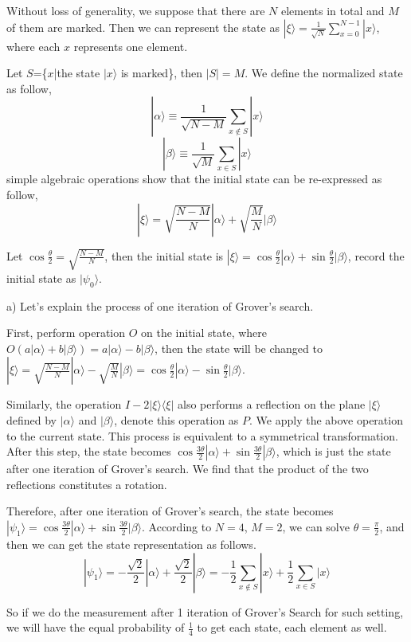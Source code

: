 \documentclass[11pt]{article}
\begin{document}
Without loss of generality, we suppose that there are $N$ elements in total and $M$ of them are marked. Then we can represent the state as $|\xi\rangle=\frac{1}{\sqrt{N}}\sum_{x=0}^{N-1}|x\rangle$, where each $x$ represents one element.

Let $S$=\{$x$|the state $|x\rangle$ is marked\}, then $|S|=M$. We define the normalized state as follow,
$$
|\alpha\rangle\equiv\frac{1}{\sqrt{N-M}}\sum_{x\notin S}|x\rangle
$$
$$
|\beta\rangle\equiv\frac{1}{\sqrt{M}}\sum_{x\in S}|x\rangle
$$
simple algebraic operations show that the initial state can be re-expressed as follow,
$$
|\xi\rangle=\sqrt{\frac{N-M}{N}}|\alpha\rangle+\sqrt{\frac{M}{N}}|\beta\rangle
$$

Let $\cos\frac{\theta}{2}=\sqrt{\frac{N-M}{N}}$, then the initial state is $|\xi\rangle=\cos\frac{\theta}{2}|\alpha\rangle+\sin\frac{\theta}{2}|\beta\rangle$, record the initial state as $|\psi_0\rangle$.

a) Let's explain the process of one iteration of Grover's search. 

First, perform operation $O$ on the initial state, where $O(a|\alpha\rangle+b|\beta\rangle)=a|\alpha\rangle-b|\beta\rangle$, then the state will be changed to $|\xi\rangle=\sqrt{\frac{N-M}{N}}|\alpha\rangle-\sqrt{\frac{M}{N}}|\beta\rangle=\cos\frac{\theta}{2}|\alpha\rangle-\sin\frac{\theta}{2}|\beta\rangle$. 

Similarly, the operation $I-2|\xi\rangle\langle\xi|$ also performs a reflection on the plane $|\xi\rangle$ defined by $|\alpha\rangle$ and $|\beta\rangle$, denote this operation as $P$. We apply the above operation to the current state.  This process is equivalent to a symmetrical transformation. After this step, the state becomes $\cos\frac{3\theta}{2}|\alpha\rangle+\sin\frac{3\theta}{2}|\beta\rangle$, which is just the state after one iteration of Grover’s search. We find that the product of the two reflections constitutes a rotation.

Therefore, after one iteration of Grover’s search, the state becomes $|\psi_1\rangle=\cos\frac{3\theta}{2}|\alpha\rangle+\sin\frac{3\theta}{2}|\beta\rangle$. According to $N=4$, $M=2$, we can solve $\theta=\frac{\pi}{2}$, and then we can get the state representation as follows.
$$
|\psi_1\rangle=-\frac{\sqrt{2}}{2}|\alpha\rangle+\frac{\sqrt{2}}{2}|\beta\rangle=-\frac{1}{2}\sum_{x\notin S}|x\rangle+\frac{1}{2}\sum_{x\in S}|x\rangle
$$

So if we do the measurement after 1 iteration of Grover’s Search for such setting, we will have the equal probability of $\frac{1}{4}$ to get each state, each element as well.
\end{document}
